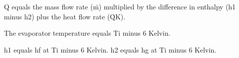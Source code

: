 Q equals the mass flow rate (ṁ) multiplied by the difference in enthalpy (h1 minus h2) plus the heat flow rate (Q̇K).  

The evaporator temperature equals Ti minus 6 Kelvin.  

h1 equals hf at Ti minus 6 Kelvin.  
h2 equals hg at Ti minus 6 Kelvin.